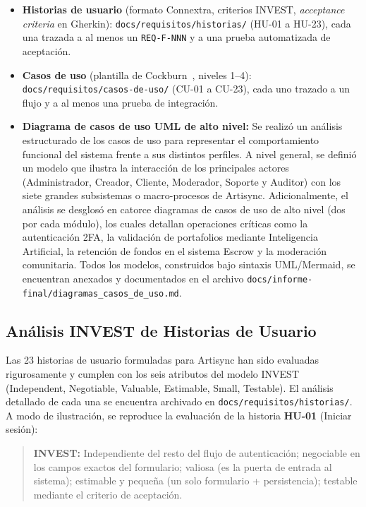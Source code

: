 \begin{itemize}
  \item \textbf{Historias de usuario} (formato Connextra, criterios
    INVEST, \emph{acceptance criteria} en Gherkin):
    \texttt{docs/requisitos/historias/} (HU-01 a HU-23), cada una trazada
    a al menos un \texttt{REQ-F-NNN} y a una prueba automatizada de
    aceptación.
  \item \textbf{Casos de uso} (plantilla de Cockburn~\cite{COCKBURN2000},
    niveles 1--4): \texttt{docs/requisitos/casos-de-uso/} (CU-01 a
    CU-23), cada uno trazado a un flujo y a al menos una prueba de
    integración.
  \item \textbf{Diagrama de casos de uso UML de alto nivel:}
    Se realizó un análisis estructurado de los casos de uso para representar
    el comportamiento funcional del sistema frente a sus distintos perfiles.
    A nivel general, se definió un modelo que ilustra la interacción de los
    principales actores (Administrador, Creador, Cliente, Moderador, Soporte
    y Auditor) con los siete grandes subsistemas o macro-procesos de Artisync.
    Adicionalmente, el análisis se desglosó en catorce diagramas de casos de
    uso de alto nivel (dos por cada módulo), los cuales detallan operaciones
    críticas como la autenticación 2FA, la validación de portafolios mediante
    Inteligencia Artificial, la retención de fondos en el sistema Escrow y
    la moderación comunitaria. Todos los modelos, construidos bajo sintaxis
    UML/Mermaid, se encuentran anexados y documentados en el archivo
    \texttt{docs/informe-final/diagramas\_casos\_de\_uso.md}.
\end{itemize}

\subsection{Análisis INVEST de Historias de Usuario}

Las 23 historias de usuario formuladas para Artisync han sido evaluadas rigurosamente y cumplen con los seis atributos del modelo INVEST (Independent, Negotiable, Valuable, Estimable, Small, Testable). El análisis detallado de cada una se encuentra archivado en \texttt{docs/requisitos/historias/}. A modo de ilustración, se reproduce la evaluación de la historia \textbf{HU-01} (Iniciar sesión):

\begin{quote}
\textbf{INVEST:} Independiente del resto del flujo de autenticación; negociable en los campos exactos del formulario; valiosa (es la puerta de entrada al sistema); estimable y pequeña (un solo formulario + persistencia); testable mediante el criterio de aceptación.
\end{quote}

